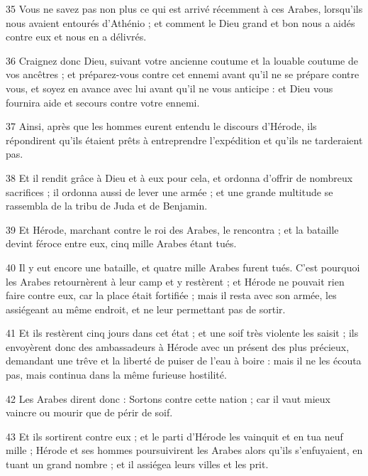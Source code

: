 \par 35 Vous ne savez pas non plus ce qui est arrivé récemment à ces Arabes, lorsqu'ils nous avaient entourés d'Athénio ; et comment le Dieu grand et bon nous a aidés contre eux et nous en a délivrés.

\par 36 Craignez donc Dieu, suivant votre ancienne coutume et la louable coutume de vos ancêtres ; et préparez-vous contre cet ennemi avant qu'il ne se prépare contre vous, et soyez en avance avec lui avant qu'il ne vous anticipe : et Dieu vous fournira aide et secours contre votre ennemi.

\par 37 Ainsi, après que les hommes eurent entendu le discours d'Hérode, ils répondirent qu'ils étaient prêts à entreprendre l'expédition et qu'ils ne tarderaient pas.

\par 38 Et il rendit grâce à Dieu et à eux pour cela, et ordonna d'offrir de nombreux sacrifices ; il ordonna aussi de lever une armée ; et une grande multitude se rassembla de la tribu de Juda et de Benjamin.

\par 39 Et Hérode, marchant contre le roi des Arabes, le rencontra ; et la bataille devint féroce entre eux, cinq mille Arabes étant tués.

\par 40 Il y eut encore une bataille, et quatre mille Arabes furent tués. C'est pourquoi les Arabes retournèrent à leur camp et y restèrent ; et Hérode ne pouvait rien faire contre eux, car la place était fortifiée ; mais il resta avec son armée, les assiégeant au même endroit, et ne leur permettant pas de sortir.

\par 41 Et ils restèrent cinq jours dans cet état ; et une soif très violente les saisit ; ils envoyèrent donc des ambassadeurs à Hérode avec un présent des plus précieux, demandant une trêve et la liberté de puiser de l'eau à boire : mais il ne les écouta pas, mais continua dans la même furieuse hostilité.

\par 42 Les Arabes dirent donc : Sortons contre cette nation ; car il vaut mieux vaincre ou mourir que de périr de soif.

\par 43 Et ils sortirent contre eux ; et le parti d'Hérode les vainquit et en tua neuf mille ; Hérode et ses hommes poursuivirent les Arabes alors qu'ils s'enfuyaient, en tuant un grand nombre ; et il assiégea leurs villes et les prit.

